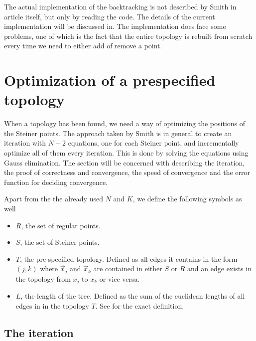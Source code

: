 The actual implementation of the backtracking is not described by Smith in
article itself, but only by reading the code. The details of the current
implementation will be discussed in. The implementation does face some problems, one of which is
the fact that the entire topology is rebuilt from scratch every time we need to
either add of remove a point.

\section{Optimization of a prespecified topology}
\label{sec:optim-presp-topol}

When a topology has been found, we need a way of optimizing the positions of the
Steiner points. The approach taken by Smith is in general to create an iteration
with $N-2$ equations, one for each Steiner point, and incrementally optimize all
of them every iteration. This is done by solving the equations using Gauss
elimination. The section will be concerned with describing the iteration, the
proof of correctness and convergence, the speed of convergence and the error
function for deciding convergence.

Apart from the the already used $N$ and $K$, we define the following symbols as
well
\begin{itemize}
\item $R$, the set of regular points.
\item $S$, the set of Steiner points.
\item $T$, the pre-specified topology. Defined as all edges it contains in the
  form $(j,k)$ where $\vec x_j$ and $\vec x_k$ are contained in either $S$ or $R$ and an edge
  exists in the topology from $x_j$ to $x_k$ or vice versa.
\item $L$, the length of the tree. Defined as the sum of the euclidean lengths of
  all edges in in the topology $T$. See  for the exact definition.
\end{itemize}


\subsection{The iteration}
\label{sec:iteration}

